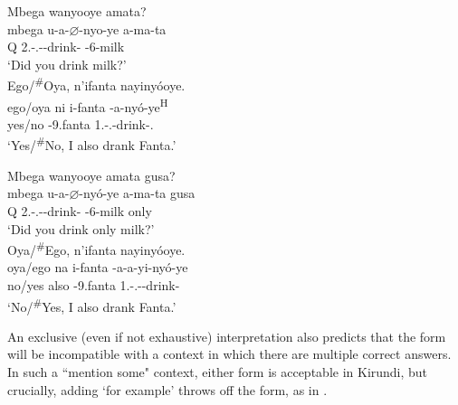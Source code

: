 \documentclass[output=paper]{langscibook}
\begin{document}
\ea
\label{bkm:Ref76372401}
\begin{xlist}[Q.\CJ:]
Mbega wanyooye amata?\\
\gll
mbega  u-a-$\varnothing$-nyo-ye  a-ma-ta\\
Q  2\SG.\SM-\N.\PST{}-\CJ{}-drink-\PFV{}  \AUG{}-6-milk\\
\glt
‘Did you drink milk?’\\

Ego/\textsuperscript{\#}Oya, n’ifanta nayinyóoye.\\
\gll
ego/oya  ni  i-fanta  \N{}-a-nyó-ye\textsuperscript{H}\\
yes/no  \COP{}  \AUG{}-9.fanta  1\SG{}.\SM{}-\N{}.\PST{}-drink-\PFV{}.\REL{}\\
\glt
‘Yes/\textsuperscript{\#}No, I also drank Fanta.’\\

\end{xlist}
\z

\ea
\label{bkm:Ref76372415}
\begin{xlist}[Q.\CJ:]
Mbega wanyooye amata gusa?\\
\gll
mbega  u-a-$\varnothing$-nyó-ye  a-ma-ta  gusa\\
Q  2\SG{}.\SM{}-\N.\PST{}-\CJ{}-drink-\PFV{}  \AUG{}-6-milk  only\\
\glt
‘Did you drink only milk?’\\

Oya/\textsuperscript{\#}Ego, n’ifanta nayinyóoye.\\
\gll
oya/ego  na  i-fanta  \N{}-a-a-yi-nyó-ye\\
no/yes  also  \AUG{}-9.fanta  1\SG{}.\SM-\N.\PST-\OM{}-drink-\PFV{}\\
\glt
‘No/\textsuperscript{\#}Yes, I also drank Fanta.’\\

\end{xlist}
\z

An exclusive (even if not exhaustive) interpretation also predicts that the \CJ{} form will be incompatible with a context in which there are multiple correct answers. In such a ``mention some" context, either form is acceptable in Kirundi, but crucially, adding ‘for example’ throws off the \CJ{} form, as in .
\end{document}
